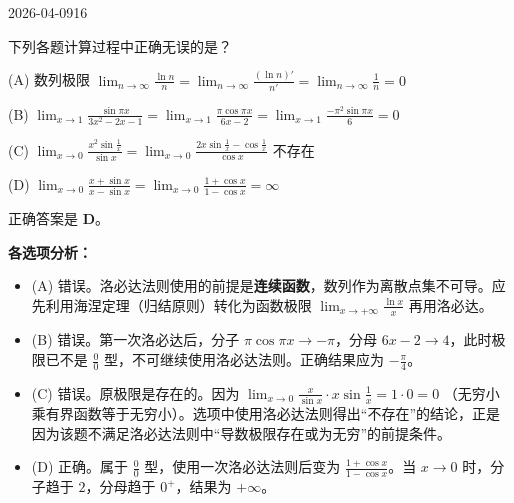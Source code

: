 \begin{mistake}{2026-04-09}{16}

\begin{problemcontent}
下列各题计算过程中正确无误的是？

(A) 数列极限 \(\displaystyle \lim_{n\to\infty} \frac{\ln n}{n} = \lim_{n\to\infty} \frac{(\ln n)'}{n'} = \lim_{n\to\infty} \frac{1}{n} = 0 \)

(B) \(\displaystyle \lim_{x\to 1} \frac{\sin \pi x}{3x^2 - 2x - 1} = \lim_{x\to 1} \frac{\pi \cos \pi x}{6x - 2} = \lim_{x\to 1} \frac{-\pi^2 \sin \pi x}{6} = 0 \)

(C) \(\displaystyle \lim_{x\to 0} \frac{x^2 \sin \frac{1}{x}}{\sin x} = \lim_{x\to 0} \frac{2x \sin \frac{1}{x} - \cos \frac{1}{x}}{\cos x} \) 不存在

(D) \(\displaystyle \lim_{x\to 0} \frac{x + \sin x}{x - \sin x} = \lim_{x\to 0} \frac{1 + \cos x}{1 - \cos x} = \infty \)
\end{problemcontent}

\begin{solutioncontent}
正确答案是 \textbf{D}。

\textbf{各选项分析：}
\begin{itemize}
 \item (A) 错误。洛必达法则使用的前提是\textbf{连续函数}，数列作为离散点集不可导。应先利用海涅定理（归结原则）转化为函数极限 \(\lim_{x \to +\infty} \frac{\ln x}{x}\) 再用洛必达。
 \item (B) 错误。第一次洛必达后，分子 \(\pi \cos \pi x \to -\pi\)，分母 \(6x - 2 \to 4\)，此时极限已不是 \(\frac{0}{0}\) 型，不可继续使用洛必达法则。正确结果应为 \(-\frac{\pi}{4}\)。
 \item (C) 错误。原极限是存在的。因为 \(\lim_{x \to 0} \frac{x}{\sin x} \cdot x \sin \frac{1}{x} = 1 \cdot 0 = 0\) （无穷小乘有界函数等于无穷小）。选项中使用洛必达法则得出“不存在”的结论，正是因为该题不满足洛必达法则中“导数极限存在或为无穷”的前提条件。
 \item (D) 正确。属于 \(\frac{0}{0}\) 型，使用一次洛必达法则后变为 \(\frac{1+\cos x}{1-\cos x}\)。当 \(x \to 0\) 时，分子趋于 \(2\)，分母趋于 \(0^+\)，结果为 \(+\infty\)。
\end{itemize}
\end{solutioncontent}


\end{mistake}
